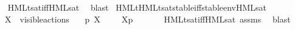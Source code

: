 \begin{isabellebody}
\ \ \isamarkupfalse%
\ HMLt{\isacharunderscore}{\kern0pt}sat{\isacharunderscore}{\kern0pt}iff{\isacharunderscore}{\kern0pt}HML{\isacharunderscore}{\kern0pt}sat\ \isamarkupfalse%
\ blast\isanewline
{}\isamarkupfalse%
\ HMLt{\isacharunderscore}{\kern0pt}HMLt{\isacharunderscore}{\kern0pt}sat{\isacharunderscore}{\kern0pt}stable{\isacharunderscore}{\kern0pt}iff{\isacharunderscore}{\kern0pt}stable{\isacharunderscore}{\kern0pt}env{\isacharunderscore}{\kern0pt}HML{\isacharunderscore}{\kern0pt}sat{\isacharcolon}{\kern0pt}\isanewline
\ \ \ {\isacartoucheopen}X\ {\isasymsubseteq}\ visible{\isacharunderscore}{\kern0pt}actions{\isacartoucheclose}\isanewline
\ \ \ {\isacartoucheopen}p\ {\isasymTTurnstile}{\isacharbrackleft}{\kern0pt}X{\isacharbrackright}{\kern0pt}\ {\isasymphi}\ \ {\isasymLongleftrightarrow}\ \ {\isasymtheta}{\isacharbrackleft}{\kern0pt}X{\isacharbrackright}{\kern0pt}{\isacharparenleft}{\kern0pt}p{\isacharparenright}{\kern0pt}\ {\isasymTurnstile}\ {\isasymsigma}{\isacharparenleft}{\kern0pt}{\isasymphi}{\isacharparenright}{\kern0pt}{\isacartoucheclose}\ \isanewline
\ \ \isamarkupfalse%
\ HMLt{\isacharunderscore}{\kern0pt}sat{\isacharunderscore}{\kern0pt}iff{\isacharunderscore}{\kern0pt}HML{\isacharunderscore}{\kern0pt}sat\ assms\ \isamarkupfalse%
\ blast%
\endisatagvisible
{\isafoldvisible}%
%
\isadelimvisible
%
\endisadelimvisible
\isanewline
\isanewline
{}\isamarkupfalse%
\ %
%
\isadelimtheory
%
\endisadelimtheory
%
\isatagtheory
%
\endisatagtheory
{\isafoldtheory}%
%
\isadelimtheory
%
\endisadelimtheory
%
\end{isabellebody}%
\endinput
